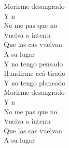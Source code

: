 \begin{cancion}[Arrancármelo][Wos]
\begin{chorus}
	 Morirme desangrado\\
\jump
	Y n\\
	No me pas que no\\
	Vuelva a intentr\\
	Que las cas vuelvan\\
A su lugar\\
\jump
	 Y no tengo pensado\\
	 Hundirme acá tirado\\
	 Y no tengo planeado\\
	 Morirme desangrado\\
\jump
	Y n\\
	No me pas que no\\
	Vuelva a intentr\\
	Que las cas vuelvan\\
A su lugar\\
	\end{chorus}%
	\jump\\
\end{cancion}%
